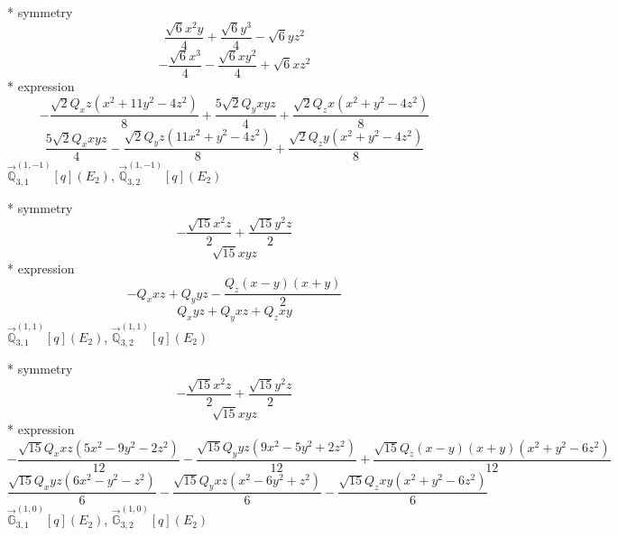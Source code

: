 \documentclass[fleqn,8pt]{jsarticle}
\begin{document}
\noindent\quad ** symmetry
\begin{dmath*}
\frac{\sqrt{6} x^{2} y}{4} + \frac{\sqrt{6} y^{3}}{4} - \sqrt{6} y z^{2}
\end{dmath*}
\begin{dmath*}
- \frac{\sqrt{6} x^{3}}{4} - \frac{\sqrt{6} x y^{2}}{4} + \sqrt{6} x z^{2}
\end{dmath*}
\noindent\quad ** expression
\begin{dmath*}
- \frac{\sqrt{2} Q_{x} z \left(x^{2} + 11 y^{2} - 4 z^{2}\right)}{8} + \frac{5 \sqrt{2} Q_{y} x y z}{4} + \frac{\sqrt{2} Q_{z} x \left(x^{2} + y^{2} - 4 z^{2}\right)}{8}
\end{dmath*}
\begin{dmath*}
\frac{5 \sqrt{2} Q_{x} x y z}{4} - \frac{\sqrt{2} Q_{y} z \left(11 x^{2} + y^{2} - 4 z^{2}\right)}{8} + \frac{\sqrt{2} Q_{z} y \left(x^{2} + y^{2} - 4 z^{2}\right)}{8}
\end{dmath*}
\noindent\quad $\vec{\mathbb{Q}}_{3,1}^{(1,-1)}[q](E_{2})$, $\vec{\mathbb{Q}}_{3,2}^{(1,-1)}[q](E_{2})$

\noindent\quad ** symmetry
\begin{dmath*}
- \frac{\sqrt{15} x^{2} z}{2} + \frac{\sqrt{15} y^{2} z}{2}
\end{dmath*}
\begin{dmath*}
\sqrt{15} x y z
\end{dmath*}
\noindent\quad ** expression
\begin{dmath*}
- Q_{x} x z + Q_{y} y z - \frac{Q_{z} \left(x - y\right) \left(x + y\right)}{2}
\end{dmath*}
\begin{dmath*}
Q_{x} y z + Q_{y} x z + Q_{z} x y
\end{dmath*}
\noindent\quad $\vec{\mathbb{Q}}_{3,1}^{(1,1)}[q](E_{2})$, $\vec{\mathbb{Q}}_{3,2}^{(1,1)}[q](E_{2})$

\noindent\quad ** symmetry
\begin{dmath*}
- \frac{\sqrt{15} x^{2} z}{2} + \frac{\sqrt{15} y^{2} z}{2}
\end{dmath*}
\begin{dmath*}
\sqrt{15} x y z
\end{dmath*}
\noindent\quad ** expression
\begin{dmath*}
- \frac{\sqrt{15} Q_{x} x z \left(5 x^{2} - 9 y^{2} - 2 z^{2}\right)}{12} - \frac{\sqrt{15} Q_{y} y z \left(9 x^{2} - 5 y^{2} + 2 z^{2}\right)}{12} + \frac{\sqrt{15} Q_{z} \left(x - y\right) \left(x + y\right) \left(x^{2} + y^{2} - 6 z^{2}\right)}{12}
\end{dmath*}
\begin{dmath*}
\frac{\sqrt{15} Q_{x} y z \left(6 x^{2} - y^{2} - z^{2}\right)}{6} - \frac{\sqrt{15} Q_{y} x z \left(x^{2} - 6 y^{2} + z^{2}\right)}{6} - \frac{\sqrt{15} Q_{z} x y \left(x^{2} + y^{2} - 6 z^{2}\right)}{6}
\end{dmath*}
\noindent\quad $\vec{\mathbb{G}}_{3,1}^{(1,0)}[q](E_{2})$, $\vec{\mathbb{G}}_{3,2}^{(1,0)}[q](E_{2})$
\end{document}
